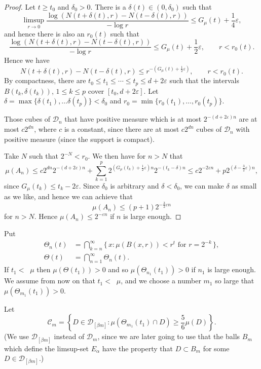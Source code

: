 \documentclass[11pt]{article}
\theoremstyle{definition}
\numberwithin{equation}{section}
\numberwithin{figure}{section}
\numberwithin{table}{section}
\DeclareMathOperator{\udimh}{\overline{dim}_H}
\begin{document}
\begin{proof}
Let $t \geq t_0$ and $\delta_0 > 0$. There is a $\delta (t) \in (0,
\delta_0)$ such that
\[
\limsup_{r \to 0} \frac{\log (N(t + \delta (t), r) - N(t - \delta (t), r))}{- \log r} \leq G_\mu (t) + \frac{1}{4} \varepsilon,
\]
and hence there is also an $r_0 (t)$ such that
\[
\frac{\log (N(t + \delta (t), r) - N(t - \delta (t), r))}{- \log r}
\leq G_\mu (t) + \frac{1}{2} \varepsilon, \qquad r < r_0 (t).
\]
Hence we have
\[
N(t + \delta (t), r) - N(t - \delta (t), r) \leq r^{-(G_\mu (t) +
\frac{1}{2} \varepsilon)}, \qquad r < r_0 (t).
\]
By compactness, there are $t_0 \leq t_1 \leq \cdots \leq t_p \leq d + 2 \varepsilon$ such that the intervals $B(t_k, \delta (t_k))$, $1
\leq k \leq p$ cover $[t_0, d + 2 \varepsilon]$. Let $\delta = \max
\{\delta (t_1), \ldots \delta (t_p) \} < \delta_0$ and $r_0 = \min
\{ r_0 (t_1), \ldots, r_0 (t_p) \}$.

Those cubes of $\mathscr{D}_n$ that have positive measure which is at most $2^{-(d + 2 \varepsilon) n}$ are at most $c 2^{dn}$, where $c$ is a constant, since there are at most $c 2^{dn}$ cubes of $\mathscr{D}_n$ with positive measure (since the support is compact).

Take $N$ such that $2^{-N} < r_0$. We then have for $n > N$ that
\[
\mu (A_n) \leq c 2^{dn} 2^{-(d + 2 \varepsilon) n} + \sum_{k = 1}^p 2^{(G_\mu (t_k) + \frac{1}{2} \varepsilon) n} 2^{-(t_k - \delta) n}
\leq c 2^{- 2 \varepsilon n} + p 2^{(\delta - \frac{3}{2}
\varepsilon)n},
\]
since $G_\mu (t_k) \leq t_k - 2 \varepsilon$. Since $\delta_0$ is arbitrary and $\delta < \delta_0$, we can make $\delta$ as small as we like, and hence we can achieve that
\[
\mu (A_n) \leq (p+1) 2^{- \frac{3}{2} \varepsilon n}
\]
for $n > N$. Hence $\mu (A_n) \leq 2^{- \varepsilon n}$ if $n$ is large enough.
\end{proof}

Put
\begin{align*}
\Theta_n (t) &= \bigcap_{k=n}^\infty \{\, x : \mu (B(x,r)) < r^t
\text{ for } r = 2^{- k} \,\}, \\ \Theta (t) &= \bigcap_{n=1}^\infty
\Theta_n (t).
\end{align*}
If $t_1 < \udimh \mu$ then $\mu (\Theta (t_1)) > 0$ and so $\mu (\Theta_{n_1} (t_1)) > 0$ if $n_1$ is large enough. We assume from now on that $t_1 < \udimh \mu$, and we choose a number $m_1$ so large that $\mu (\Theta_{m_1} (t_1)) > 0$.

Let
\[
\mathscr{C}_m = \left\{ D \in \mathscr{D}_{[\beta m]} : \mu (\Theta_{m_1} (t_1) \cap D) \geq \frac{5}{6} \mu (D) \right\}.
\]
(We use $\mathscr{D}_{[\beta m]}$ instead of $\mathscr{D}_m$, since we are later going to use that the balls $B_m$ which define the limsup-set $E_\alpha$ have the property that $D \subset B_m$ for some $D \in \mathscr{D}_{[\beta m]}$.)
\end{document}
